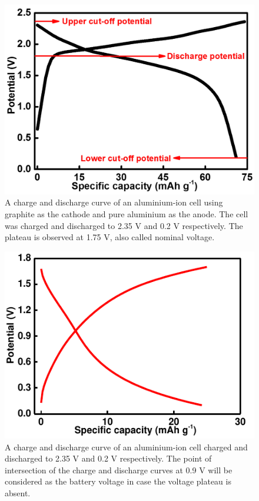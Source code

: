 \begin{itemize}
\begin{figure}[h!]
\centering
\includegraphics[width=\textwidth]{Figures/chap1fig/CDCforcellvoltage}
\caption{A charge and discharge curve of an aluminium-ion cell using graphite as the cathode and pure aluminium as the anode. The cell was charged and discharged to 2.35 V and 0.2 V respectively. The plateau is observed at 1.75 V, also called nominal voltage.}
\label{Figures/chap1fig:CDCforcellvoltage}
\end{figure}

\begin{figure}[tbh!]
\centering
\includegraphics[width=\textwidth]{Figures/chap1fig/batpot.pdf}
\caption{A charge and discharge curve of an aluminium-ion cell charged and discharged to 2.35 V and 0.2 V respectively. The point of intersection of the charge and discharge curves at 0.9 V will be considered as the battery voltage in case the voltage plateau is absent.}
\label{Figures/chap1fig:batpot}
\end{figure}


\end{itemize}
